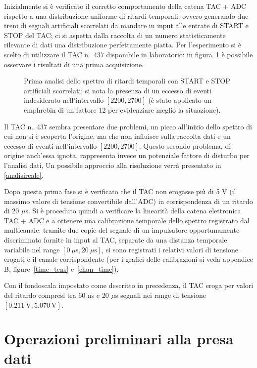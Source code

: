 \documentclass[10pt, oneside, a4paper]{article}   	%
\begin{document}
Inizialmente si è verificato il corretto comportamento della catena TAC + ADC rispetto a una distribuzione uniforme di ritardi temporali, ovvero generando due treni di segnali artificiali scorrelati da mandare in input alle entrate di START e STOP del TAC; ci si aspetta dalla raccolta di un numero statisticamente rilevante di dati una distribuzione perfettamente piatta. Per l'esperimento si è scelto di utilizzare il TAC n.~437 disponibile in laboratorio: in figura~\ref{rumore1} è possibile osservare i risultati di una prima acquisizione.
%
\begin{figure}[h]
  \centering  
  
  \caption{Prima analisi dello spettro di ritardi temporali con START e STOP artificiali scorrelati; si nota la presenza di un eccesso di eventi indesiderato nell'intervallo $[2200,2700]$ (è stato applicato un emph{rebin} di un fattore 12 per evidenziare meglio la situazione).}
  \label{rumore1}
\end{figure}
%

Il TAC n.~437 sembra presentare due problemi, un picco all'inizio dello spettro di cui non si è scoperta l'origine, ma che non influisce sulla raccolta dati e un eccesso di eventi nell'intervallo $[2200,2700]$. Questo secondo problema, di origine anch'essa ignota, rappresenta invece un potenziale fattore di disturbo per l'analisi dati, Un possibile approccio alla risoluzione verrà presentato in \cref{analisireale}.

Dopo questa prima fase si è verificato che il TAC  non erogasse più di 5 V (il massimo valore di tensione convertibile dall'ADC) in corrispondenza di un ritardo di 20 $\mu$s. Si è proceduto quindi a verificare la linearità della catena elettronica TAC + ADC e a ottenere una calibrazione temporale dello spettro registrato dal multicanale: tramite due copie del segnale di un impulsatore opportunamente discriminato fornite in input al TAC, separate da una distanza temporale variabile nel range $[0 \ \mu \mbox{s},20 \ \mu \mbox{s}]$, si sono registrati i relativi valori di tensione erogati e il canale corrispondente (per i grafici delle calibrazioni si veda appendice B, figure~\ref{time_tens} e~\ref{chan_time}).

Con il fondoscala impostato come descritto in precedenza, il TAC eroga per valori del ritardo compresi tra 60 ns e 20 $\mu$s segnali nei range di tensione $[0.211 \ \mbox{V}, 5.070 \ \mbox{V}]$.
%
%
\section{Operazioni preliminari alla presa dati}
\end{document}
